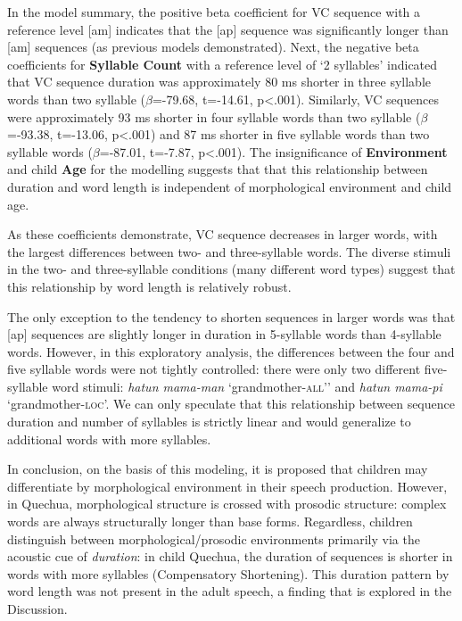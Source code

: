 \documentclass[
]{article}
\begin{document}
In the model summary, the positive beta coefficient for VC sequence with a reference level {[}am{]} indicates that the {[}ap{]} sequence was significantly longer than {[}am{]} sequences (as previous models demonstrated). Next, the negative beta coefficients for \textbf{Syllable Count} with a reference level of `2 syllables' indicated that VC sequence duration was approximately 80 ms shorter in three syllable words than two syllable (\(\beta\)=-79.68, t=-14.61, p\textless.001). Similarly, VC sequences were approximately 93 ms shorter in four syllable words than two syllable (\(\beta\)=-93.38, t=-13.06, p\textless.001) and 87 ms shorter in five syllable words than two syllable words (\(\beta\)=-87.01, t=-7.87, p\textless.001). The insignificance of \textbf{Environment} and child \textbf{Age} for the modelling suggests that that this relationship between duration and word length is independent of morphological environment and child age.

As these coefficients demonstrate, VC sequence decreases in larger words, with the largest differences between two- and three-syllable words. The diverse stimuli in the two- and three-syllable conditions (many different word types) suggest that this relationship by word length is relatively robust.

The only exception to the tendency to shorten sequences in larger words was that {[}ap{]} sequences are slightly longer in duration in 5-syllable words than 4-syllable words. However, in this exploratory analysis, the differences between the four and five syllable words were not tightly controlled: there were only two different five-syllable word stimuli: \emph{hatun mama-man} `grandmother-\textsc{all}'' and \emph{hatun mama-pi} `grandmother-\textsc{loc}'. We can only speculate that this relationship between sequence duration and number of syllables is strictly linear and would generalize to additional words with more syllables.

In conclusion, on the basis of this modeling, it is proposed that children may differentiate by morphological environment in their speech production. However, in Quechua, morphological structure is crossed with prosodic structure: complex words are always structurally longer than base forms. Regardless, children distinguish between morphological/prosodic environments primarily via the acoustic cue of \emph{duration}: in child Quechua, the duration of sequences is shorter in words with more syllables (Compensatory Shortening). This duration pattern by word length was not present in the adult speech, a finding that is explored in the Discussion.
\end{document}
